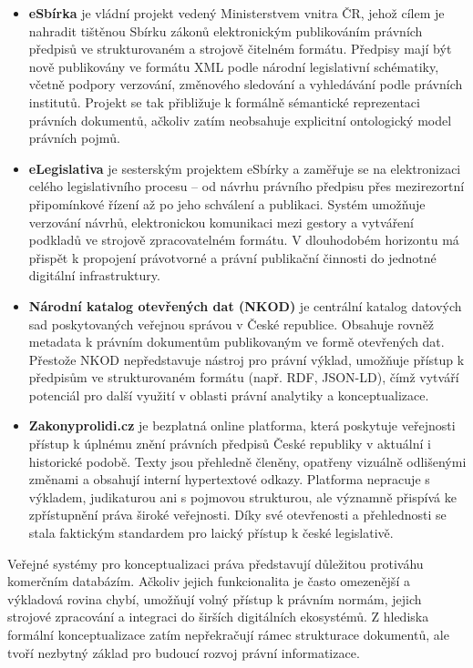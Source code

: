 \begin{itemize}
\item \textbf{eSbírka} je vládní projekt vedený Ministerstvem vnitra ČR, jehož cílem je nahradit tištěnou Sbírku zákonů elektronickým publikováním právních předpisů ve strukturovaném a strojově čitelném formátu. Předpisy mají být nově publikovány ve formátu XML podle národní legislativní schématiky, včetně podpory verzování, změnového sledování a vyhledávání podle právních institutů. Projekt se tak přibližuje k formálně sémantické reprezentaci právních dokumentů, ačkoliv zatím neobsahuje explicitní ontologický model právních pojmů. \cite{esbirka, esbirka_elegislativa}

\item \textbf{eLegislativa} je sesterským projektem eSbírky a zaměřuje se na elektronizaci celého legislativního procesu – od návrhu právního předpisu přes mezirezortní připomínkové řízení až po jeho schválení a publikaci. Systém umožňuje verzování návrhů, elektronickou komunikaci mezi gestory a vytváření podkladů ve strojově zpracovatelném formátu. V dlouhodobém horizontu má přispět k propojení právotvorné a právní publikační činnosti do jednotné digitální infrastruktury. \cite{esbirka_elegislativa}

\item \textbf{Národní katalog otevřených dat (NKOD)} je centrální katalog datových sad poskytovaných veřejnou správou v České republice. Obsahuje rovněž metadata k právním dokumentům publikovaným ve formě otevřených dat. Přestože NKOD nepředstavuje nástroj pro právní výklad, umožňuje přístup k předpisům ve strukturovaném formátu (např. RDF, JSON-LD), čímž vytváří potenciál pro další využití v oblasti právní analytiky a konceptualizace. \cite{NKOD}

\item \textbf{Zakonyprolidi.cz} je bezplatná online platforma, která poskytuje veřejnosti přístup k úplnému znění právních předpisů České republiky v aktuální i historické podobě. Texty jsou přehledně členěny, opatřeny vizuálně odlišenými změnami a obsahují interní hypertextové odkazy. Platforma nepracuje s výkladem, judikaturou ani s pojmovou strukturou, ale významně přispívá ke zpřístupnění práva široké veřejnosti. Díky své otevřenosti a přehlednosti se stala faktickým standardem pro laický přístup k české legislativě. \cite{zakonyprolidi}
\end{itemize}

Veřejné systémy pro konceptualizaci práva představují důležitou protiváhu komerčním databázím. Ačkoliv jejich funkcionalita je často omezenější a výkladová rovina chybí, umožňují volný přístup k právním normám, jejich strojové zpracování a integraci do širších digitálních ekosystémů. Z hlediska formální konceptualizace zatím nepřekračují rámec strukturace dokumentů, ale tvoří nezbytný základ pro budoucí rozvoj právní informatizace.


